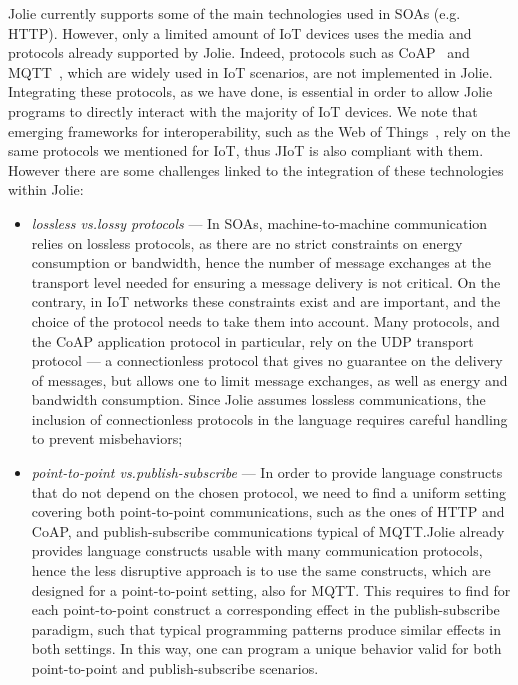 Jolie currently supports some of the main technologies used in SOAs (e.g.
HTTP). However, only a limited amount of IoT devices uses the media and
protocols already supported by Jolie. Indeed, protocols such as
CoAP~\cite{doi:10.17487/RFC7252,coap} and MQTT~\cite{mqtt-v3.1.1,mqtt},
which are widely used in IoT scenarios, are not implemented in Jolie.
Integrating these protocols, as we have done, is essential in order to allow
Jolie programs to directly interact with the majority of IoT devices. We note
that emerging frameworks for interoperability, such as the Web of
Things~\cite{w3c17}, rely on the same protocols we mentioned for IoT, thus JIoT
is also compliant with them.
%
However there are some
challenges linked to the integration of these technologies within Jolie:

\begin{itemize}
  \item \textit{lossless vs.\@ lossy protocols} --- In SOAs,
  machine-to-machine communication relies on lossless protocols, as there are no
  strict constraints on energy consumption or bandwidth, hence the number of
  message exchanges at the transport level needed for ensuring a message
  delivery is not critical. On the contrary, in IoT networks these
  constraints exist and are important, and the choice of the protocol needs to
  take them into account. Many protocols, and the CoAP application protocol in
  particular, rely on the UDP transport protocol --- a connectionless protocol
  that gives no guarantee on the delivery of messages, but allows one to limit
  message exchanges, as well as energy and bandwidth consumption. Since Jolie assumes
  lossless communications, the inclusion of connectionless protocols in the
  language requires careful handling to prevent misbehaviors;

  \item \textit{point-to-point vs.\@ publish-subscribe} --- In order
  to provide language constructs that do not depend on the chosen protocol, we
  need to find a uniform setting covering both point-to-point communications,
  such as the ones of HTTP and CoAP, and publish-subscribe communications
  typical of MQTT.\@ Jolie already provides language constructs usable with many
  communication protocols, hence the less disruptive approach is to use the same
  constructs, which are designed for a point-to-point setting, also for MQTT.\@
  This requires to find for each point-to-point construct a corresponding effect
  in the publish-subscribe paradigm, such that typical programming patterns
  produce similar effects in both settings. In this way, one can program a
  unique behavior valid for both point-to-point and publish-subscribe
  scenarios.
  
\end{itemize} 